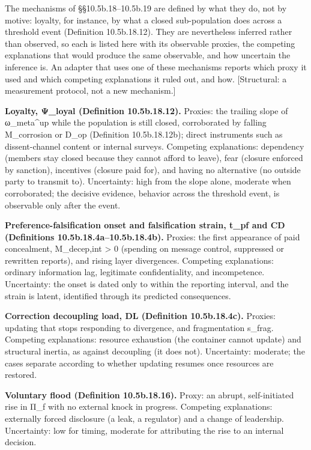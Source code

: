\documentclass[
]{article}
\begin{document}
The mechanisms of §§10.5b.18--10.5b.19 are defined by what they do, not
by motive: loyalty, for instance, by what a closed sub-population does
across a threshold event (Definition 10.5b.18.12). They are nevertheless
inferred rather than observed, so each is listed here with its
observable proxies, the competing explanations that would produce the
same observable, and how uncertain the inference is. An adapter that
uses one of these mechanisms reports which proxy it used and which
competing explanations it ruled out, and how. {[}Structural: a
measurement protocol, not a new mechanism.{]}

\textbf{Loyalty, Ψ\_loyal (Definition 10.5b.18.12).} Proxies: the
trailing slope of ω\_meta\^{}up while the population is still closed,
corroborated by falling M\_corrosion or D\_op (Definition 10.5b.18.12b);
direct instruments such as dissent-channel content or internal surveys.
Competing explanations: dependency (members stay closed because they
cannot afford to leave), fear (closure enforced by sanction), incentives
(closure paid for), and having no alternative (no outside party to
transmit to). Uncertainty: high from the slope alone, moderate when
corroborated; the decisive evidence, behavior across the threshold
event, is observable only after the event.

\textbf{Preference-falsification onset and falsification strain, t\_pf
and CD (Definitions 10.5b.18.4a--10.5b.18.4b).} Proxies: the first
appearance of paid concealment, M\_decep,int \textgreater{} 0 (spending
on message control, suppressed or rewritten reports), and rising layer
divergences. Competing explanations: ordinary information lag,
legitimate confidentiality, and incompetence. Uncertainty: the onset is
dated only to within the reporting interval, and the strain is latent,
identified through its predicted consequences.

\textbf{Correction decoupling load, DL (Definition 10.5b.18.4c).}
Proxies: updating that stops responding to divergence, and fragmentation
s\_frag. Competing explanations: resource exhaustion (the container
cannot update) and structural inertia, as against decoupling (it does
not). Uncertainty: moderate; the cases separate according to whether
updating resumes once resources are restored.

\textbf{Voluntary flood (Definition 10.5b.18.16).} Proxy: an abrupt,
self-initiated rise in Π\_f with no external knock in progress.
Competing explanations: externally forced disclosure (a leak, a
regulator) and a change of leadership. Uncertainty: low for timing,
moderate for attributing the rise to an internal decision.
\end{document}
